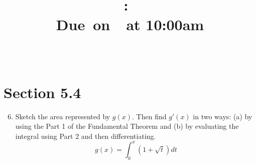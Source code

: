 \documentclass{article}
\title{
    \vspace{2in}
    \textmd{\textbf{\hmwkClass:\ \hmwkTitle}}\\
    \normalsize\vspace{0.1in}\small{Due\ on\ \hmwkDueDate\ at 10:00am}\\
    \vspace{0.1in}\large{\textit{\hmwkClassInstructor\ \hmwkClassTime}}
    \vspace{3in}
}
\author{\hmwkAuthorName}
\date{}
\begin{document}
\maketitle

\pagebreak

\section{Section 5.4}
\begin{enumerate}
\setcounter{enumi}{5}
	\item Sketch the area represented by $g(x)$. Then find $g'(x)$ in two ways: (a) by using the Part 1 of the Fundamental Theorem and (b) by evaluating the integral using Part 2 and then differentiating. $$g(x)=\int_{0}^{x}(1+\sqrt{t})dt$$
	\begin{center}
\end{center}
\end{enumerate}
\end{document}
